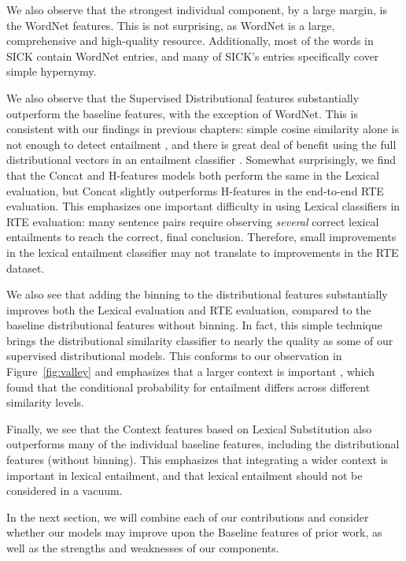 We also observe that the strongest individual component, by a large margin, is
the WordNet features. This is not surprising, as WordNet is a large,
comprehensive and high-quality resource. Additionally, most of the words in SICK
contain WordNet entries, and many of SICK's entries specifically cover
simple hypernymy.

We also observe that the Supervised Distributional features substantially
outperform the baseline features, with the exception of WordNet. This is
consistent with our findings in previous chapters: simple cosine similarity
alone is not enough to detect entailment
\cite{weeds:2004:coling,baroni:2012:eacl,lenci:2012:starsem}, and there is
great deal of benefit using the full distributional vectors in an entailment
classifier
\cite{roller:2014:coling,kruszewski:2015:tacl,roller:2016:emnlp,shwartz:2016:acl}.
Somewhat surprisingly, we find that the Concat and H-features models both
perform the same in the Lexical evaluation, but Concat slightly outperforms
H-features in the end-to-end RTE evaluation. This emphasizes one important
difficulty in using Lexical classifiers in RTE evaluation: many sentence pairs
require observing {\em several} correct lexical entailments to reach the
correct, final conclusion. Therefore, small improvements in the lexical
entailment classifier may not translate to improvements in the RTE dataset.

We also see that adding the binning to the distributional features
substantially improves both the Lexical evaluation and RTE evaluation, compared
to the baseline distributional features without binning. In fact, this simple
technique brings the distributional similarity classifier to nearly the quality
as some of our supervised distributional models. This conforms to our
observation in Figure~\ref{fig:valley} and emphasizes that a larger context
is important , which found that the conditional
probability for entailment differs across different similarity levels.

Finally, we see that the Context features based on Lexical Substitution
also outperforms many of the individual baseline features, including
the distributional features (without binning). This emphasizes that integrating
a wider context is important in lexical entailment, and that lexical
entailment should not be considered in a vacuum.

In the next section, we will combine each of our contributions and consider
whether our models may improve upon the Baseline features of prior work,
as well as the strengths and weaknesses of our components.

